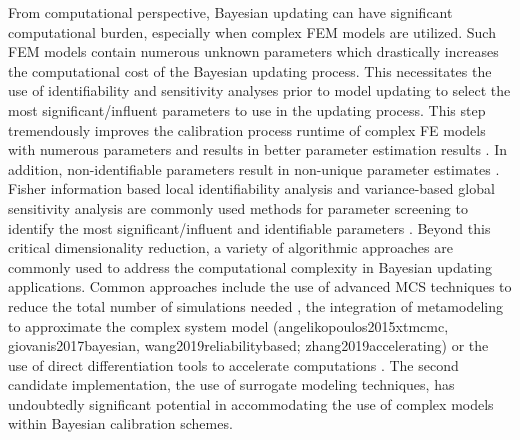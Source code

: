 From computational perspective, Bayesian updating can have significant computational burden, especially when complex FEM models are utilized. Such FEM models contain numerous unknown parameters which drastically increases the computational cost of the Bayesian updating process. This necessitates the use of identifiability and sensitivity analyses prior to model updating to select the most significant/influent parameters to use in the updating process. This step tremendously improves the calibration process runtime of complex FE models with numerous parameters and results in better parameter estimation results \citep{ramancha2021bayesianupdating}. In addition, non-identifiable parameters result in non-unique parameter estimates \citep{ramancha2020nonunique}. Fisher information based local identifiability analysis and variance-based global sensitivity analysis are commonly used methods for parameter screening to identify the most significant/influent and identifiable parameters \citep{ramancha2021bayesianupdating}. Beyond this critical dimensionality reduction, a variety of algorithmic approaches are commonly used to address the computational complexity in Bayesian updating applications. Common approaches include the use of advanced MCS techniques to reduce the total number of simulations needed \citep{quiroz2018speeding}, the integration of metamodeling to approximate the complex system model (angelikopoulos2015xtmcmc, giovanis2017bayesian, wang2019reliabilitybased; zhang2019accelerating) or the use of direct differentiation tools to accelerate computations \citep{astroza2017batch}. The second candidate implementation, the use of surrogate modeling techniques, has undoubtedly significant potential in accommodating the use of complex models within Bayesian calibration schemes.     

